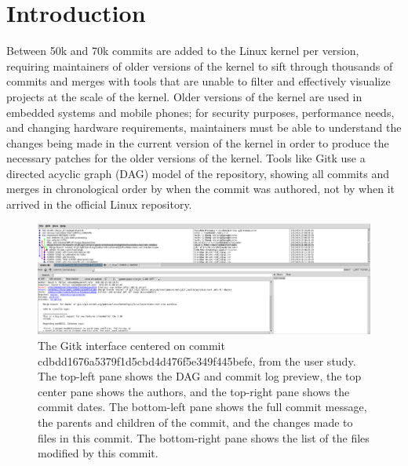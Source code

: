 
\section{Introduction}

Between 50k and 70k commits are added to the Linux kernel per version,
requiring maintainers of older versions of the kernel to sift through
thousands of commits and merges with tools that are unable to filter and
effectively visualize projects at the scale of the kernel. Older
versions of the kernel are used in embedded systems and mobile phones;
for security purposes, performance needs, and changing hardware
requirements, maintainers must be able to understand the changes being
made in the current version of the kernel in order to produce the
necessary patches for the older versions of the kernel. Tools like Gitk
use a directed acyclic graph (DAG) model of the repository, showing all
commits and merges in chronological order by when the commit was
authored, not by when it arrived in the official Linux repository.

\begin{figure}
        \centering
        \includegraphics[width=0.9\figwidth]{figures/gitk.png}
        \caption{The Gitk interface centered on commit
          cdbdd1676a5379f1d5cbd4d476f5e349f445befe, \comB from the user
          study. The top-left pane shows the DAG and commit log preview,
          the top center pane shows the authors, and the top-right
          pane shows the commit dates. The bottom-left pane shows the
          full commit message, the parents and children of the commit,
          and the changes made to files in this commit. The bottom-right
          pane shows the list of the files modified by this commit.}
        \label{fig:gitk}
\end{figure}

